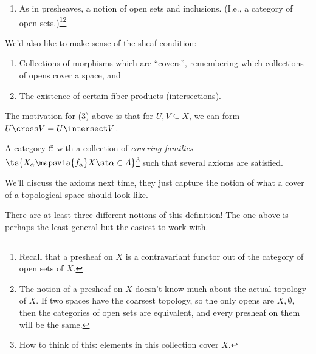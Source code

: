 \begin{answer}

\envlist

\begin{enumerate}
\def\labelenumi{\arabic{enumi}.}
\tightlist
\item
  As in presheaves, a notion of open sets and inclusions. (I.e., a
  category of open sets.)\footnote{Recall that a presheaf on \(X\) is a
    contravariant functor out of the category of open sets of \(X\).}\footnote{The
    notion of a presheaf on \(X\) doesn't know much about the actual
    topology of \(X\). If two spaces have the coarsest topology, so the
    only opens are \(X, \emptyset\), then the categories of open sets
    are equivalent, and every presheaf on them will be the same.}
\end{enumerate}

We'd also like to make sense of the sheaf condition:

\begin{enumerate}
\def\labelenumi{\arabic{enumi}.}
\setcounter{enumi}{1}
\item
  Collections of morphisms which are ``covers'', remembering which
  collections of opens cover a space, and
\item
  The existence of certain fiber products (intersections).
\end{enumerate}

\end{answer}

\begin{remark}

The motivation for (3) above is that for \(U, V \subseteq X\), we can
form \(U\cross V = U\intersect V\).

\end{remark}

\begin{definition}

A category \(\mathcal{C}\) with a collection of \emph{covering families}
\(\ts{X_\alpha \mapsvia{f_\alpha} X \st \alpha\in A}\)\footnote{How to
  think of this: elements in this collection cover \(X\).} such that
several axioms are satisfied.

\end{definition}

We'll discuss the axioms next time, they just capture the notion of what
a cover of a topological space should look like.

\begin{warnings}

There are at least three different notions of this definition! The one
above is perhaps the least general but the easiest to work with.

\end{warnings}

